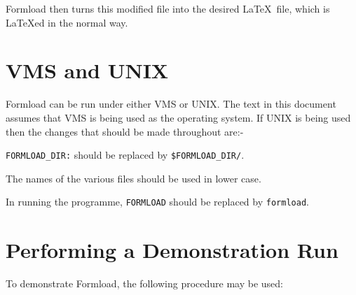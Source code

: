 Formload then turns this modified file into the desired \LaTeX\ file, which
is \LaTeX ed in the normal way. 

\section{VMS and UNIX}

Formload can be run under either VMS or UNIX. The text in this document
assumes that VMS is being used as the operating system. If  UNIX is being
used then the changes that should be made throughout are:- 

\begin{list}{{-}}{}
\item  {\tt FORMLOAD\_DIR:} should be replaced by {\tt \$FORMLOAD\_DIR/}. 
\item  The names of the various files should be used in lower case. 
\item  In running the programme, {\tt FORMLOAD} should be replaced by
       {\tt formload}. 
\end{list}


\section{Performing a Demonstration Run}

To demonstrate Formload, the following procedure may be used:

